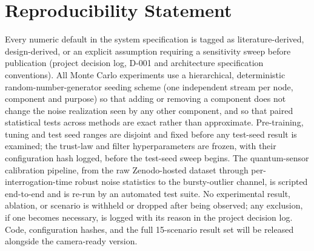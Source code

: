 \documentclass[journal]{IEEEtran}
\begin{document}
\section*{Reproducibility Statement}
Every numeric default in the system specification is tagged as literature-derived, design-derived, or an
explicit assumption requiring a sensitivity sweep before publication (project decision log, D-001 and
architecture specification conventions). All Monte Carlo experiments use a hierarchical, deterministic
random-number-generator seeding scheme (one independent stream per node, component and purpose) so that
adding or removing a component does not change the noise realization seen by any other component, and so
that paired statistical tests across methods are exact rather than approximate. Pre-training, tuning and
test seed ranges are disjoint and fixed before any test-seed result is examined; the trust-law and filter
hyperparameters are frozen, with their configuration hash logged, before the test-seed sweep begins. The
quantum-sensor calibration pipeline, from the raw Zenodo-hosted dataset \cite{darmagnac2024dataset}
through per-interrogation-time robust noise statistics to the bursty-outlier channel, is scripted
end-to-end and is re-run by an automated test suite. No experimental result, ablation, or scenario is
withheld or dropped after being observed; any exclusion, if one becomes necessary, is logged with its
reason in the project decision log. Code, configuration hashes, and the full 15-scenario result set will
be released alongside the camera-ready version.



\end{document}
